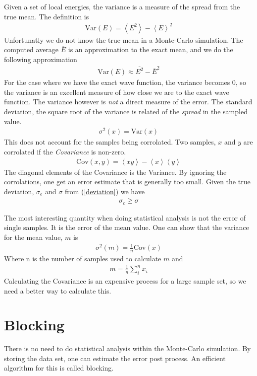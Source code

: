 \documentclass[a4paper, 12pt, titlepage]{article}
\begin{document}
 Given a set of local energies, the variance is a measure of the spread from the true mean. The definition is
 \begin{align*}
 	\text{Var}(E) = \left< E^2 \right> - \left< E \right> ^2 
 \end{align*}
 Unfortunatly we do not know the true mean in a Monte-Carlo simulation. The computed average $\overline E$ is an approximation to the exact mean, and we do the following approximation
 \begin{align*}
 	\text{Var}(E) \approx \overline{E^2} - \overline{E}^2 
 \end{align*}
 For the case where we have the exact wave function, the variance becomes $0$, so the variance is an excellent measure of how close we are to the exact wave function. The variance however is \textit{not} a direct measure of the error. The standard deviation, the square root of the variance is related of the \textit{spread} in the sampled value. 
 \begin{align}
 	\sigma ^2(x) = \text{Var}(x)
 	\label{deviation}
 \end{align}
 This does not account for the samples being corrolated. Two samples, $x$ and $y$ are corrolated if the \textit{Covariance} is non-zero.
 \begin{align*}
 	\text{Cov}(x,y) = \left< xy \right> - \left< x \right> \left<y \right> 
 \end{align*}
 The diagonal elements of the Covariance is the Variance. By ignoring the corrolations, one get an error estimate that is generally too small. Given the true deviation, $\sigma_e$ and $\sigma$ from (\ref{deviation}) we have
 \begin{align*}
 	\sigma_c \geq \sigma
 \end{align*}

 The most interesting quantity when doing statistical analysis is not the error of single samples. It is the error of the mean value. One can show that the variance for the mean value, $m$ is 
 \begin{align}
 	\sigma^2 (m) = \frac{1}{n} \text{Cov}(x)
 	\label{covariance}
 \end{align}
 Where n is the number of samples used to calculate $m$ and 
 \begin{align*}
 	m = \frac{1}{n} \sum_i^n x_i
 \end{align*}
 Calculating the Covariance is an expensive process for a large sample set, so we need a better way to calculate this. 

\section*{Blocking}
 There is no need to do statistical analysis within the Monte-Carlo simulation. By storing the data set, one can estimate the error post process. An efficient algorithm for this is called blocking. 
\end{document}
